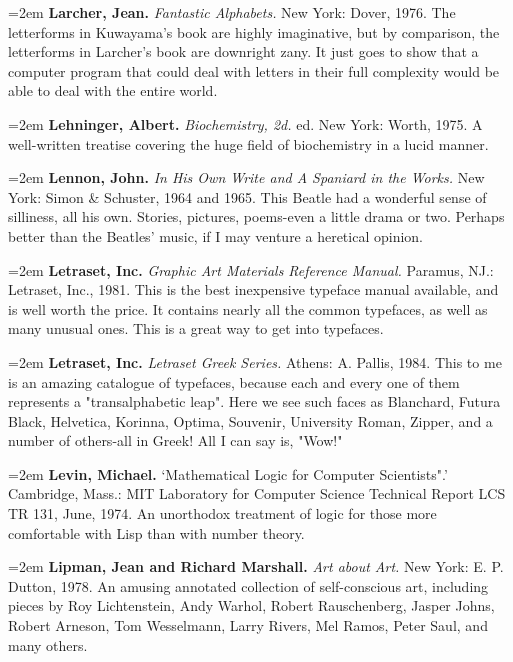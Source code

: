 \par\noindent\hangindent=2em {\bf Larcher, Jean.} {\it Fantastic Alphabets.} New York: Dover, 1976. The letterforms in Kuwayama's book are highly imaginative, but by comparison, the letterforms in Larcher's book are downright zany. It just goes to show that a computer program that could deal with letters in their full complexity would be able to deal with the entire world.

\par\noindent\hangindent=2em {\bf Lehninger, Albert.} {\it Biochemistry, 2d.} ed. New York: Worth, 1975. A well-written treatise covering the huge field of biochemistry in a lucid manner.

\par\noindent\hangindent=2em {\bf Lennon, John.} {\it In His Own Write and A Spaniard in the Works.} New York: Simon \& Schuster, 1964 and 1965. This Beatle had a wonderful sense of silliness, all his own. Stories, pictures, poems-even a little drama or two. Perhaps better than the Beatles' music, if I may venture a heretical opinion.

\par\noindent\hangindent=2em {\bf Letraset, Inc.} {\it Graphic Art Materials Reference Manual.} Paramus, NJ.: Letraset, Inc., 1981. This is the best inexpensive typeface manual available, and is well worth the price. It contains nearly all the common typefaces, as well as many unusual ones. This is a great way to get into typefaces.

\par\noindent\hangindent=2em {\bf Letraset, Inc.} {\it Letraset Greek Series.} Athens: A. Pallis, 1984. This to me is an amazing catalogue of typefaces, because each and every one of them represents a "transalphabetic leap". Here we see such faces as Blanchard, Futura Black, Helvetica, Korinna, Optima, Souvenir, University Roman, Zipper, and a number of others-all in Greek! All I can say is, "Wow!"

\par\noindent\hangindent=2em {\bf Levin, Michael.} `Mathematical Logic for Computer Scientists".' Cambridge, Mass.: MIT Laboratory for Computer Science Technical Report LCS TR 131, June, 1974. An unorthodox treatment of logic for those more comfortable with Lisp than with number theory.

\par\noindent\hangindent=2em {\bf Lipman, Jean and Richard Marshall.} {\it Art about Art.} New York: E. P. Dutton, 1978. An amusing annotated collection of self-conscious art, including pieces by Roy Lichtenstein, Andy Warhol, Robert Rauschenberg, Jasper Johns, Robert Arneson, Tom Wesselmann, Larry Rivers, Mel Ramos, Peter Saul, and many others.

